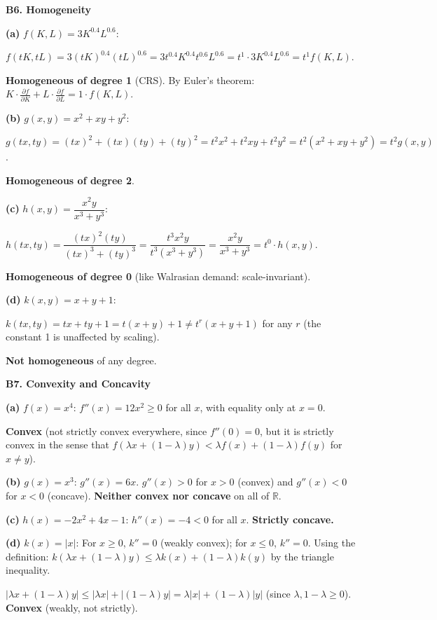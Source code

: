 \documentclass[12pt, a4paper]{article}
\theoremstyle{definition}
\newcommand{\R}{\mathbb{R}}
\begin{document}
\begin{solbox}
\textbf{B6. Homogeneity}

\textbf{(a)} $f(K,L)=3K^{0.4}L^{0.6}$:

$f(tK,tL)=3(tK)^{0.4}(tL)^{0.6}=3t^{0.4}K^{0.4}t^{0.6}L^{0.6}=t^{1}\cdot 3K^{0.4}L^{0.6}=t^1 f(K,L)$.

\textbf{Homogeneous of degree 1} (CRS). By Euler's theorem: $K\cdot\frac{\partial f}{\partial K}+L\cdot\frac{\partial f}{\partial L}=1\cdot f(K,L)$.

\textbf{(b)} $g(x,y)=x^2+xy+y^2$:

$g(tx,ty)=(tx)^2+(tx)(ty)+(ty)^2=t^2x^2+t^2xy+t^2y^2=t^2(x^2+xy+y^2)=t^2g(x,y)$.

\textbf{Homogeneous of degree 2}.

\textbf{(c)} $h(x,y)=\dfrac{x^2y}{x^3+y^3}$:

$h(tx,ty)=\dfrac{(tx)^2(ty)}{(tx)^3+(ty)^3}=\dfrac{t^3 x^2 y}{t^3(x^3+y^3)}=\dfrac{x^2y}{x^3+y^3}=t^0\cdot h(x,y)$.

\textbf{Homogeneous of degree 0} (like Walrasian demand: scale-invariant).

\textbf{(d)} $k(x,y)=x+y+1$:

$k(tx,ty)=tx+ty+1=t(x+y)+1\neq t^r(x+y+1)$ for any $r$ (the constant 1 is unaffected by scaling).

\textbf{Not homogeneous} of any degree.
\end{solbox}

\begin{solbox}
\textbf{B7. Convexity and Concavity}

\textbf{(a)} $f(x)=x^4$: $f''(x)=12x^2\geq 0$ for all $x$, with equality only at $x=0$.

\textbf{Convex} (not strictly convex everywhere, since $f''(0)=0$, but it is strictly convex in the sense that $f(\lambda x+(1-\lambda)y)<\lambda f(x)+(1-\lambda)f(y)$ for $x\neq y$).

\textbf{(b)} $g(x)=x^3$: $g''(x)=6x$. $g''(x)>0$ for $x>0$ (convex) and $g''(x)<0$ for $x<0$ (concave). \textbf{Neither convex nor concave} on all of $\R$.

\textbf{(c)} $h(x)=-2x^2+4x-1$: $h''(x)=-4<0$ for all $x$. \textbf{Strictly concave.}

\textbf{(d)} $k(x)=|x|$: For $x\geq 0$, $k''=0$ (weakly convex); for $x\leq 0$, $k''=0$. Using the definition: $k(\lambda x+(1-\lambda)y)\leq\lambda k(x)+(1-\lambda)k(y)$ by the triangle inequality.

$|\lambda x+(1-\lambda)y|\leq |\lambda x|+|(1-\lambda)y|=\lambda|x|+(1-\lambda)|y|$ (since $\lambda,1-\lambda\geq 0$). \textbf{Convex} (weakly, not strictly).
\end{solbox}
\end{document}
